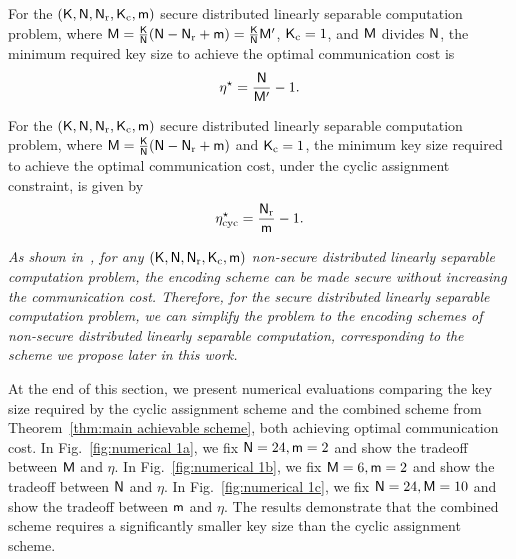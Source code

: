 \documentclass[conference,letterpaper]{IEEEtran}
\begin{document}
\begin{rem}
\label{rem:extreme cases}
\em

For the $({\sf K}, {\sf N}, {\sf N}_{\rm r}, {\sf K}_{\rm c}, {\sf m})$ secure distributed linearly separable computation problem, where ${\sf M} = \frac{{\sf K}}{{\sf N}} ({\sf N} - {\sf N}_{\rm r} + {\sf m}) = \frac{{\sf K}}{{\sf N}} {\sf M}^{\prime}$, ${\sf K}_{\rm c} = 1$, and ${\sf M}$ divides ${\sf N}$, the minimum required key size to achieve the optimal communication cost is
\begin{align}
    \eta^{\star} = \frac{{\sf N}}{{\sf M}^{\prime}} - 1. \label{eq:gradient eta rho rep}
\end{align}

For the $({\sf K}, {\sf N}, {\sf N}_{\rm r}, {\sf K}_{\rm c}, {\sf m})$ secure distributed linearly separable computation problem, where ${\sf M} = \frac{{\sf K}}{{\sf N}} ({\sf N} - {\sf N}_{\rm r} + {\sf m})$ and ${\sf K}_{\rm c} = 1$, the minimum key size required to achieve the optimal communication cost, under the cyclic assignment constraint, is given by
\begin{align}
    \eta^{\star}_{\text{cyc}} = \frac{{\sf N}_{\rm r}}{{\sf m}} - 1. \label{eq:gradient eta cyc}
\end{align}

\end{rem}

\begin{rem}
\label{rem:no secure}
\em
As shown in~\cite[Theorem 2]{wan2022secure}, for any $({\sf K}, {\sf N}, {\sf N}_{\rm r}, {\sf K}_{\rm c}, {\sf m})$ non-secure distributed linearly separable computation problem, the encoding scheme can be made secure without increasing the communication cost. Therefore, for the secure distributed linearly separable computation problem, we can simplify the problem to the encoding schemes of non-secure distributed linearly separable computation, corresponding to the scheme we propose later in this work.
\end{rem}
At the end of this section, we present numerical evaluations comparing the key size required by the cyclic assignment scheme and the combined scheme from Theorem~\ref{thm:main achievable scheme}, both achieving optimal communication cost. In Fig.~\ref{fig:numerical 1a}, we fix ${\sf N} = 24, {\sf m} = 2$ and show the tradeoff between ${\sf M}$ and $\eta$. In Fig.~\ref{fig:numerical 1b}, we fix ${\sf M} = 6, {\sf m} = 2$ and show the tradeoff between ${\sf N}$ and $\eta$. In Fig.~\ref{fig:numerical 1c}, we fix ${\sf N} = 24, {\sf M} = 10$ and show the tradeoff between ${\sf m}$ and $\eta$. The results demonstrate that the combined scheme requires a significantly smaller key size than the cyclic assignment scheme.
\end{document}
